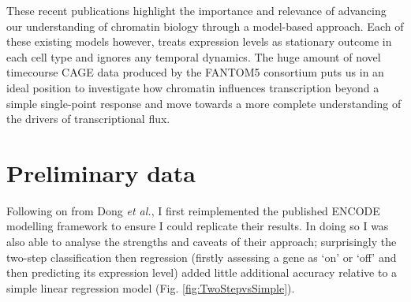 \documentclass[a4paper]{report}
\begin{document}
These recent publications highlight the importance and relevance of
advancing our understanding of chromatin biology through a model-based
approach. Each of these existing models however, treats expression
levels as stationary outcome in each cell type and ignores any temporal
dynamics. The huge amount of novel timecourse CAGE data 
produced by the FANTOM5 consortium\cite{fantom5} puts us in an ideal
position to investigate how chromatin influences transcription beyond a
simple single-point response and move towards a more complete
understanding of the drivers of transcriptional flux.


\chapter*{Preliminary data}
Following on from Dong \emph{et al.},\cite{Dong2012} I first
reimplemented the published ENCODE modelling framework to ensure I could
replicate their results. In doing so I was also able to analyse the
strengths and caveats of their approach; surprisingly the two-step classification
then regression (firstly assessing a gene as `on' or `off' and then
predicting its expression level) added little additional accuracy relative to a simple
linear regression model 
(Fig. \ref{fig:TwoStepvsSimple}). \\
\end{document}
